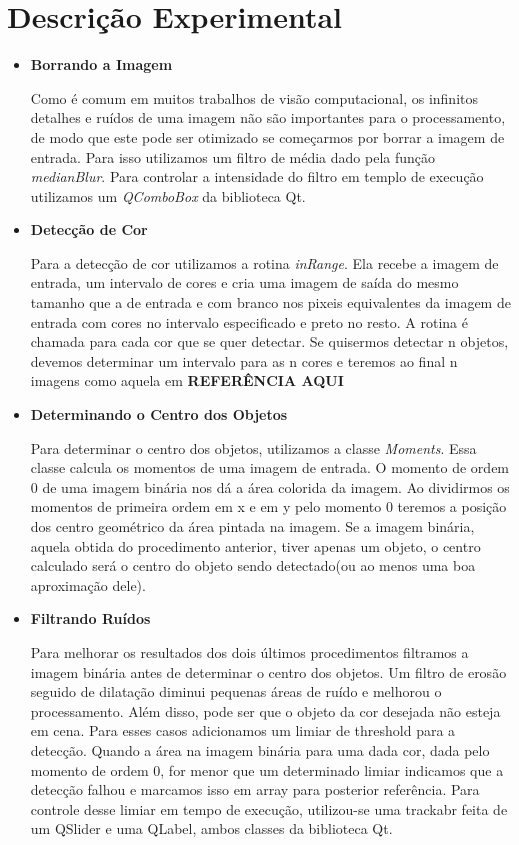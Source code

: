 \documentclass[journal]{IEEEtran}
\begin{document}
\section{Descrição Experimental}
\begin{itemize}
 \item \textbf{Borrando a Imagem}

    Como é comum em muitos trabalhos de visão computacional,
    os infinitos detalhes e ruídos de uma imagem não são importantes
    para o processamento, de modo que este pode ser otimizado se 
    começarmos por borrar a imagem de entrada. Para isso utilizamos
    um filtro de média dado pela função \textit{medianBlur}. Para
    controlar a intensidade do filtro em templo de execução utilizamos
    um \textit{QComboBox} da biblioteca Qt.
  
  \item \textbf{Detecção de Cor}
 
  Para a detecção de cor utilizamos a rotina \textit{inRange}. Ela 
  recebe a imagem de entrada, um intervalo de cores e cria uma imagem 
  de saída do mesmo tamanho que a de entrada e com branco nos pixeis 
equivalentes da imagem de entrada com cores no intervalo especificado 
e preto no resto. A rotina é chamada para cada cor que se quer 
detectar. Se quisermos detectar n objetos, devemos determinar um 
intervalo para as n cores e teremos ao final n imagens como aquela em
\textbf{REFERÊNCIA AQUI}

\item \textbf{Determinando o Centro dos Objetos}

Para determinar o centro dos objetos, utilizamos a classe 
\textit{Moments}. Essa classe calcula os momentos de uma imagem de 
entrada. O momento de ordem 0 de uma imagem binária nos dá a área
colorida da imagem. Ao dividirmos os momentos de primeira ordem em x 
e em y pelo momento 0 teremos a posição dos centro geométrico da área
pintada na imagem. Se a imagem binária, aquela obtida do procedimento 
anterior, tiver apenas um objeto, o centro calculado será o centro do
objeto sendo detectado(ou ao menos uma boa aproximação dele).

\item \textbf{Filtrando Ruídos}

Para melhorar os resultados dos dois últimos procedimentos filtramos 
a imagem binária antes de determinar o centro dos objetos.
Um filtro de erosão seguido de dilatação diminui pequenas áreas
de ruído e melhorou o processamento. Além disso, pode ser que o objeto
da cor desejada não esteja em cena. Para esses casos adicionamos um 
limiar de threshold para a detecção. Quando a área na imagem binária 
para uma dada cor, dada pelo momento de ordem 0, for menor que um 
determinado limiar indicamos que a detecção falhou e marcamos isso em 
array para posterior referência. Para controle desse limiar em tempo 
de execução, utilizou-se uma trackabr feita de um QSlider e uma 
QLabel, ambos classes da biblioteca Qt.



\end{itemize}
\end{document}
